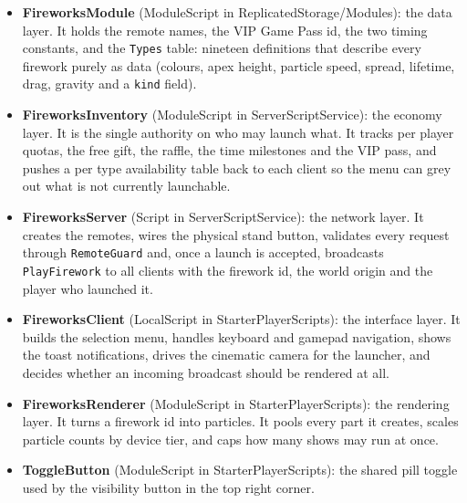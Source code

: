 \documentclass[12pt,letterpaper]{article}
\begin{document}
\begin{itemize}
  \item \textbf{FireworksModule} (ModuleScript in ReplicatedStorage/Modules): the data layer. It holds the remote names, the VIP Game Pass id, the two timing constants, and the \texttt{Types} table: nineteen definitions that describe every firework purely as data (colours, apex height, particle speed, spread, lifetime, drag, gravity and a \texttt{kind} field).
  \item \textbf{FireworksInventory} (ModuleScript in ServerScriptService): the economy layer. It is the single authority on who may launch what. It tracks per player quotas, the free gift, the raffle, the time milestones and the VIP pass, and pushes a per type availability table back to each client so the menu can grey out what is not currently launchable.
  \item \textbf{FireworksServer} (Script in ServerScriptService): the network layer. It creates the remotes, wires the physical stand button, validates every request through \texttt{RemoteGuard} and, once a launch is accepted, broadcasts \texttt{PlayFirework} to all clients with the firework id, the world origin and the player who launched it.
  \item \textbf{FireworksClient} (LocalScript in StarterPlayerScripts): the interface layer. It builds the selection menu, handles keyboard and gamepad navigation, shows the toast notifications, drives the cinematic camera for the launcher, and decides whether an incoming broadcast should be rendered at all.
  \item \textbf{FireworksRenderer} (ModuleScript in StarterPlayerScripts): the rendering layer. It turns a firework id into particles. It pools every part it creates, scales particle counts by device tier, and caps how many shows may run at once.
  \item \textbf{ToggleButton} (ModuleScript in StarterPlayerScripts): the shared pill toggle used by the visibility button in the top right corner.
\end{itemize}
\end{document}
